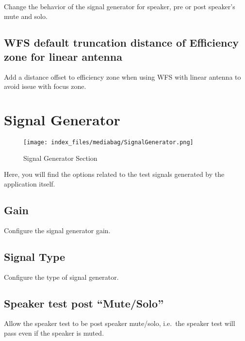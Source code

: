 \documentclass[
  letterpaper,
  DIV=11,
  numbers=noendperiod]{scrreport}
\begin{document}
Change the behavior of the signal generator for speaker, pre or post
speaker's mute and solo.

\hypertarget{wfs-default-truncation-distance-of-efficiency-zone-for-linear-antenna}{%
\subsection{WFS default truncation distance of Efficiency zone for
linear
antenna}\label{wfs-default-truncation-distance-of-efficiency-zone-for-linear-antenna}}

Add a distance offset to efficiency zone when using WFS with linear
antenna to avoid issue with focus zone.

\hypertarget{signal-generator}{%
\section{Signal Generator}\label{signal-generator}}

\begin{figure}

{\centering \texttt{[image: index\_files/mediabag/SignalGenerator.png]}

}

\caption{Signal Generator Section}

\end{figure}

Here, you will find the options related to the test signals generated by
the application itself.

\hypertarget{gain-2}{%
\subsection{Gain}\label{gain-2}}

Configure the signal generator gain.

\hypertarget{signal-type}{%
\subsection{Signal Type}\label{signal-type}}

Configure the type of signal generator.

\hypertarget{speaker-test-post-mutesolo-1}{%
\subsection{Speaker test post
``Mute/Solo''}\label{speaker-test-post-mutesolo-1}}

Allow the speaker test to be post speaker mute/solo, i.e.~the speaker
test will pass even if the speaker is muted.
\end{document}
